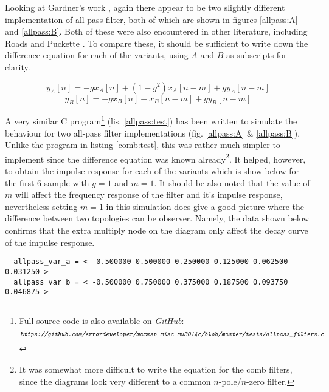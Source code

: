 \documentclass[12pt]{report}
\newcommand{\URL}[1]{\[ \texttt{\emph{#1}} \]}
\newcommand{\href}[2]{#2 (\texttt{\emph{\url{#1}}})} %
\newcommand{\Href}[2]{{#2}} %
\newcommand{\Href}[2]{\href{#1}{#2}} %
\newcommand{\URL}[1]{\[ \Href{#1}{\texttt{\emph{#1}}} \]}
\begin{document}
  Looking at Gardner's work \cite{gardner1998algorithms, gardner1992virtual},
  again there appear to be two slightly different implementation of all-pass
  filter, both of which are shown in figures \ref{allpass:A} and \ref{allpass:B}.
  Both of these were also encountered in other literature, including Roads
  \cite{roads1996computer} and Puckette \cite{puckette2007theory}. To compare
  these, it should be sufficient to write down the difference equation for
  each of the variants, using $A$ and $B$ as subscripts for clarity.

  \begin{equation}\label{eq:ayAn}
    y_A[n] = -gx_A[n] +(1-g^2)x_A[n-m] +gy_A[n-m]
  \end{equation}
  \begin{equation}\label{eq:ayBn}
    y_B[n] = -gx_B[n] +x_B[n-m] +gy_B[n-m]
  \end{equation}

  A very similar C program\footnote{Full source code is also available on \emph{GitHub}:
  \URL{https://github.com/errordeveloper/maxmsp-misc-mu3014c/blob/master/tests/allpass\_filters.c}}
  (lis. \ref{allpass:test}) has been written to simulate the behaviour for two all-pass
  filter implementations (fig. \ref{allpass:A} \& \ref{allpass:B}). Unlike the program
  in listing \ref{comb:test}, this was rather much simpler to implement since
  the difference equation was known already\footnote{It was somewhat more
  difficult to write the equation for the comb filters, since the diagrams
  look very different to a common $n$-pole/$n$-zero filter.}. It helped,
  however, to obtain the impulse response for each of the variants which is
  show below for the first 6 sample with $g=1$ and $m=1$. It should be also
  noted that the value of $m$ will affect the frequency response of the filter
  and it's impulse response, nevertheless setting $m=1$ in this simulation
  does give a good picture where the difference between two topologies can be
  observer. Namely, the data shown below confirms that the extra multiply node
  on the diagram only affect the decay curve of the impulse response.
  \begin{verbatim}
  allpass_var_a = < -0.500000 0.500000 0.250000 0.125000 0.062500 0.031250 >
  allpass_var_b = < -0.500000 0.750000 0.375000 0.187500 0.093750 0.046875 >
  \end{verbatim}
\end{document}
